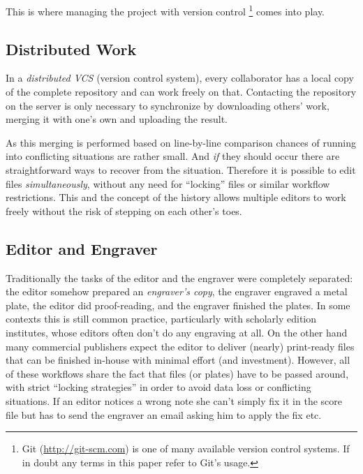 \documentclass[11pt,a4paper]{article}
\begin{document}
This is where managing the project with version control%
\footnote{Git (\url{http://git-scm.com}) is one of many available version control systems.
If in doubt any terms in this paper refer to Git's usage.}
comes into play.

\subsection{Distributed Work}
In a \textsl{distributed VCS} (version control system), every collaborator
has a local copy of the complete repository and can work freely on that.
Contacting the repository on the server is only necessary to synchronize by downloading
others' work, merging it with one's own and uploading the result.

As this merging is performed based on line-by-line comparison chances of running into
conflicting situations are rather small. And \emph{if} they should occur there are
straightforward ways to recover from the situation. Therefore it is possible to edit files
\emph{simultaneously}, without any need for “locking” files or similar workflow
restrictions. This and the concept of the history allows multiple editors to work freely without the risk of stepping on each other's toes. 

\subsection{Editor and Engraver}
Traditionally the tasks of the editor and the engraver were completely separated: the
editor somehow prepared an \emph{engraver's copy}, the engraver engraved a metal plate,
the editor did proof-reading, and the engraver finished the plates. In some contexts
this is still common practice, particularly with scholarly edition institutes, whose
editors often don't do any engraving at all. On the other hand many commercial
publishers expect the editor to deliver (nearly) print-ready files that can be
finished in-house with minimal effort (and investment). However, all of these workflows
share the fact that files (or plates) have to be passed around, with strict
“locking strategies” in order to avoid data loss or conflicting situations. If an editor
notices a wrong note she can't simply fix it in the score file but has to send the
engraver an email asking him to apply the fix etc.
\end{document}
